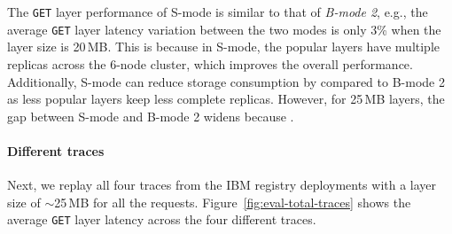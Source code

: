 %
%
The \texttt{GET} layer performance of S-mode is similar to that of \emph{B-mode 2}, e.g.,
the average \texttt{GET} layer latency variation between the two modes is only
3\% when the layer size is 20\,MB.
%
This is because in S-mode, the popular layers have multiple replicas
across the 6-node cluster, which improves the overall performance.
%
Additionally, S-mode can reduce storage consumption by \gap compared to
B-mode 2 as less popular layers keep less complete replicas.
%
However, for 25\,MB layers, the gap between S-mode and B-mode 2 widens
because .


\paragraph{Different traces} Next, we replay all four traces from the IBM registry deployments
with a layer size of $\sim$25\,MB for all the requests.
%
%
Figure~\ref{fig:eval-total-traces} shows the average \texttt{GET} layer latency across the four different traces.


